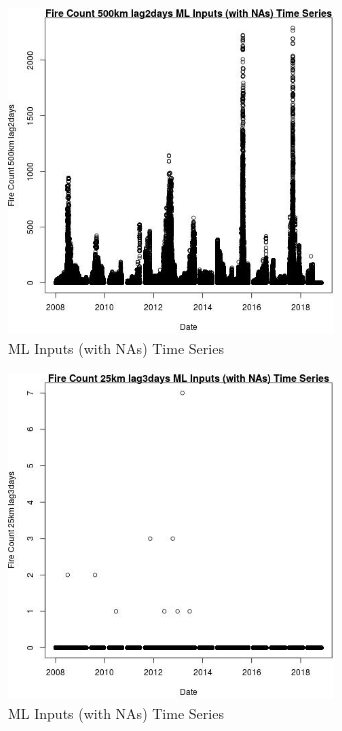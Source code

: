 \begin{figure} 
\centering  
\includegraphics[width=0.77\textwidth]{Code_Outputs/Report_ML_input_PM25_Step4_part_e_de_duplicated_aves_compiled_2019-05-20wNAs_Fire_Count_500km_lag2daysvDate.jpg} 
\caption{\label{fig:Report_ML_input_PM25_Step4_part_e_de_duplicated_aves_compiled_2019-05-20wNAsFire_Count_500km_lag2daysvDate}ML Inputs (with NAs) Time Series} 
\end{figure} 
 

\clearpage 

\begin{figure} 
\centering  
\includegraphics[width=0.77\textwidth]{Code_Outputs/Report_ML_input_PM25_Step4_part_e_de_duplicated_aves_compiled_2019-05-20wNAs_Fire_Count_25km_lag3daysvDate.jpg} 
\caption{\label{fig:Report_ML_input_PM25_Step4_part_e_de_duplicated_aves_compiled_2019-05-20wNAsFire_Count_25km_lag3daysvDate}ML Inputs (with NAs) Time Series} 
\end{figure} 
 

